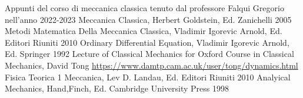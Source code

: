 \documentclass[11pt,a4paper]{book}
\theoremstyle{remark}
\begin{document}

\tableofcontents
\begin{thebibliography}{6}
 	Appunti del corso di meccanica classica tenuto dal professore Falqui Gregorio nell'anno 2022-2023
 Meccanica Classica, Herbert Goldstein, Ed. Zanichelli 2005 
 Metodi Matematica Della Meccanica Classica, Vladimir Igorevic Arnold, Ed. Editori Riuniti 2010
 Ordinary Differential Equation,  Vladimir Igorevic Arnold, Ed. Springer 1992
 Lecture of Classical Mechanics for Oxford Course in Classical Mechanics, David Tong \url{https://www.damtp.cam.ac.uk/user/tong/dynamics.html}
 Fisica Teorica 1 Meccanica, Lev D. Landau, Ed. Editori Riuniti 2010
 Analyical Mechanics, Hand,Finch, Ed. Cambridge University Press 1998
\end{thebibliography}






\end{document}
